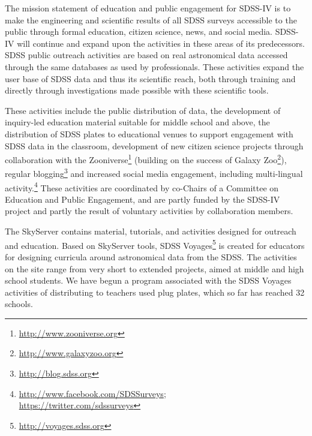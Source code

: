 The mission statement of education and public engagement for SDSS-IV
is to make the engineering and scientific results of all SDSS surveys
accessible to the public through formal education, citizen science,
news, and social media. SDSS-IV will continue and expand upon the
activities in these areas of its predecessors.  SDSS public outreach
activities are based on real astronomical data accessed through the
same databases as used by professionals.  These activities expand the
user base of SDSS data and thus its scientific reach, both through
training and directly through investigations made possible with these
scientific tools.

These activities include the public distribution of data, the
development of inquiry-led education material suitable for middle
school and above, the distribution of SDSS plates to educational
venues to support engagement with SDSS data in the classroom,
development of new citizen science projects through collaboration with
the Zooniverse\footnote{\url{http://www.zooniverse.org}} (building on
the success of Galaxy Zoo\footnote{\url{http://www.galaxyzoo.org}}),
regular blogging\footnote{\url{http://blog.sdss.org}} and increased
social media engagement, including multi-lingual
activity.\footnote{\url{http://www.facebook.com/SDSSurveys}; \\
\url{https://twitter.com/sdssurveys}} These activities are coordinated 
by co-Chairs of a Committee on Education and Public Engagement, and
are partly funded by the SDSS-IV project and partly the result of
voluntary activities by collaboration members.

The SkyServer contains material, tutorials, and activities designed
for outreach and education.  Based on SkyServer tools, SDSS
Voyages\footnote{\url{http://voyages.sdss.org}} is created for
educators for designing curricula around astronomical data from the
SDSS. The activities on the site range from very short to extended
projects, aimed at middle and high school students. We have begun a
program associated with the SDSS Voyages activities of distributing to
teachers used plug plates, which so far has reached 32 schools.

